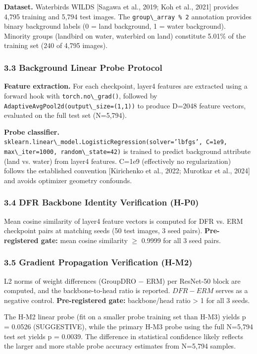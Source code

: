 \textbf{Dataset.} Waterbirds WILDS [Sagawa et al., 2019; Koh et al., 2021] provides 4,795 training and 5,794 test images. The \texttt{group\textbackslash \_array \% 2} annotation provides binary background labels (0 = land background, 1 = water background). Minority groups (landbird on water, waterbird on land) constitute 5.01\% of the training set (240 of 4,795 images).

\subsubsection{3.3 Background Linear Probe Protocol}

\textbf{Feature extraction.} For each checkpoint, layer4 features are extracted using a forward hook with \texttt{torch.no\textbackslash \_grad()}, followed by \texttt{AdaptiveAvgPool2d(output\textbackslash \_size=(1,1))} to produce D=2048 feature vectors, evaluated on the full test set (N=5,794).

\textbf{Probe classifier.} \texttt{sklearn.linear\textbackslash \_model.LogisticRegression(solver='lbfgs', C=1e9, max\textbackslash \_iter=1000, random\textbackslash \_state=42)} is trained to predict background attribute (land vs. water) from layer4 features. C=1e9 (effectively no regularization) follows the established convention [Kirichenko et al., 2022; Murotkar et al., 2024] and avoids optimizer geometry confounds.

\subsubsection{3.4 DFR Backbone Identity Verification (H-P0)}

Mean cosine similarity of layer4 feature vectors is computed for DFR vs. ERM checkpoint pairs at matching seeds (50 test images, 3 seed pairs). \textbf{Pre-registered gate:} mean cosine similarity $\geq$ 0.9999 for all 3 seed pairs.

\subsubsection{3.5 Gradient Propagation Verification (H-M2)}

L2 norms of weight differences (GroupDRO $-$ ERM) per ResNet-50 block are computed, and the backbone-to-head ratio is reported. $DFR-ERM$ serves as a negative control. \textbf{Pre-registered gate:} backbone/head ratio > 1 for all 3 seeds.

The H-M2 linear probe (fit on a smaller probe training set than H-M3) yields p = 0.0526 (SUGGESTIVE), while the primary H-M3 probe using the full N=5,794 test set yields p = 0.0039. The difference in statistical confidence likely reflects the larger and more stable probe accuracy estimates from N=5,794 samples.

